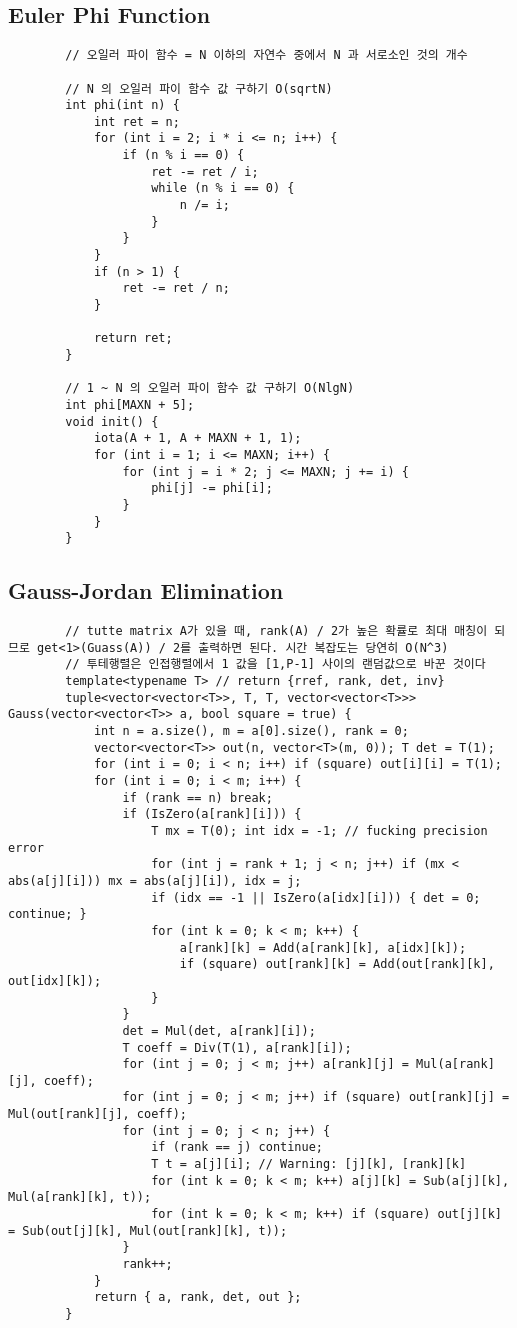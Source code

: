 \documentclass[landscape, 8pt, a4paper, oneside, twocolumn]{extarticle}
\begin{document}
	\subsection{Euler Phi Function}
	\begin{verbatim}
		// 오일러 파이 함수 = N 이하의 자연수 중에서 N 과 서로소인 것의 개수
		​
		// N 의 오일러 파이 함수 값 구하기 O(sqrtN)
		int phi(int n) {
			int ret = n;
			for (int i = 2; i * i <= n; i++) {
				if (n % i == 0) {
					ret -= ret / i;
					while (n % i == 0) {
						n /= i;
					}
				}
			}
			if (n > 1) {
				ret -= ret / n;
			}
			
			return ret;
		}
		
		// 1 ~ N 의 오일러 파이 함수 값 구하기 O(NlgN)
		int phi[MAXN + 5];
		void init() {
			iota(A + 1, A + MAXN + 1, 1);
			for (int i = 1; i <= MAXN; i++) {
				for (int j = i * 2; j <= MAXN; j += i) {
					phi[j] -= phi[i];
				}
			}
		}
	\end{verbatim}
	\subsection{Gauss-Jordan Elimination}
	\begin{verbatim}
		// tutte matrix A가 있을 때, rank(A) / 2가 높은 확률로 최대 매칭이 되므로 get<1>(Guass(A)) / 2를 출력하면 된다. 시간 복잡도는 당연히 O(N^3)
		// 투테행렬은 인접행렬에서 1 값을 [1,P-1] 사이의 랜덤값으로 바꾼 것이다
		template<typename T> // return {rref, rank, det, inv}
		tuple<vector<vector<T>>, T, T, vector<vector<T>>> Gauss(vector<vector<T>> a, bool square = true) {
			int n = a.size(), m = a[0].size(), rank = 0;
			vector<vector<T>> out(n, vector<T>(m, 0)); T det = T(1);
			for (int i = 0; i < n; i++) if (square) out[i][i] = T(1);
			for (int i = 0; i < m; i++) {
				if (rank == n) break;
				if (IsZero(a[rank][i])) {
					T mx = T(0); int idx = -1; // fucking precision error
					for (int j = rank + 1; j < n; j++) if (mx < abs(a[j][i])) mx = abs(a[j][i]), idx = j;
					if (idx == -1 || IsZero(a[idx][i])) { det = 0; continue; }
					for (int k = 0; k < m; k++) {
						a[rank][k] = Add(a[rank][k], a[idx][k]);
						if (square) out[rank][k] = Add(out[rank][k], out[idx][k]);
					}
				}
				det = Mul(det, a[rank][i]);
				T coeff = Div(T(1), a[rank][i]);
				for (int j = 0; j < m; j++) a[rank][j] = Mul(a[rank][j], coeff);
				for (int j = 0; j < m; j++) if (square) out[rank][j] = Mul(out[rank][j], coeff);
				for (int j = 0; j < n; j++) {
					if (rank == j) continue;
					T t = a[j][i]; // Warning: [j][k], [rank][k]
					for (int k = 0; k < m; k++) a[j][k] = Sub(a[j][k], Mul(a[rank][k], t));
					for (int k = 0; k < m; k++) if (square) out[j][k] = Sub(out[j][k], Mul(out[rank][k], t));
				}
				rank++;
			}
			return { a, rank, det, out };
		}
	\end{verbatim}
\end{document}
